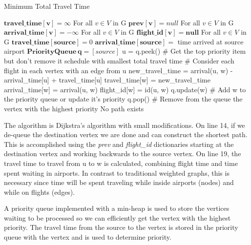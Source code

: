 \documentclass[11pt]{article}
\begin{document}
\begin{algorithm}[H]
\caption{Minimum Total Travel Time}
\label{CHalgorithm}
\begin{algorithmic}[1]
\Variables
\State $\mathbf{travel\_time[v]} = \infty$ For all $v \in V$ in G
\State $\mathbf{prev[v]} = null$ For all $v \in V$ in G
\State $\mathbf{arrival\_time[v]} = -\infty$ For all $v \in V$ in G
\State $\mathbf{flight\_id[v] = null}$ For all $v \in V$ in G
\State
\State $\mathbf{travel\_time[source]} = 0$
\State $\mathbf{arrival\_time[source]} = $ time arrived at source airport
\State $\mathbf{PriorityQueue\ q} = [source]$
\EndVariables
\State
{}
\State u = q.peek()  \# Get the top priority item but don't remove it
\State \Return schedule with smallest total travel time
\EndIf
{} \# Consider each flight in each vertex with an edge from u
\State new\_travel\_time = arrival(u, w) - arrival\_time[u] + travel\_time[u]
\State travel\_time[w] = new\_travel\_time
\State arrival\_time[w] = arrival(u, w)
\State flight\_id[w] = id(u, w)
\State 
\State q.update(w) \# Add w to the priority queue or update it's priority
\EndIf
\EndFor
\EndFor
\State q.pop() \# Remove from the queue the vertex with the highest priority
\EndWhile
\State \Return No path exists
\EndProcedure
\end{algorithmic}
\end{algorithm}

The algorithm is Dijkstra's algorithm with small modifications. On line 14, if we de-queue the destination vertex we are done and can construct the shortest path. This is accomplished using the \textit{prev} and \textit{flight\_id} dictionaries starting at the destination vertex and working backwards to the source vertex. On line 19, the travel time to travel from u to w is calculated, combining flight time and time spent waiting in airports. In contrast to traditional weighted graphs, this is necessary since time will be spent traveling while inside airports (nodes) and while on flights (edges).

A priority queue implemented with a min-heap is used to store the vertices waiting to be processed so we can efficiently get the vertex with the highest priority. The travel time from the source to the vertex is stored in the priority queue with the vertex and is used to determine priority.
\end{document}
